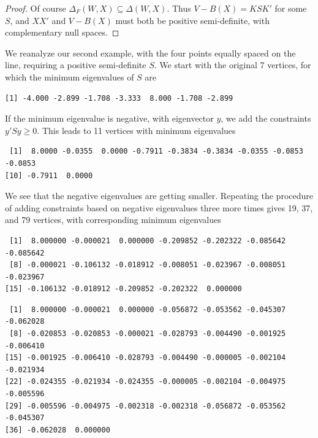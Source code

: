 \documentclass[
  12pt,
  letterpaper,
  DIV=11,
  numbers=noendperiod]{scrreprt}
\theoremstyle{remark}
\begin{document}
\begin{proof}
Of course \(\Delta_F(W,X)\subseteq\Delta(W,X)\). Thus \(V-B(X)=KSK'\)
for some \(S\), and \(XX'\) and \(V-B(X)\) must both be positive
semi-definite, with complementary null spaces.
\end{proof}

We reanalyze our second example, with the four points equally spaced on
the line, requiring a positive semi-definite \(S\). We start with the
original 7 vertices, for which the minimum eigenvalues of \(S\) are

\begin{verbatim}
[1] -4.000 -2.899 -1.708 -3.333  8.000 -1.708 -2.899
\end{verbatim}

If the minimum eigenvalue is negative, with eigenvector \(y\), we add
the constraints \(y'Sy\geq 0\). This leads to 11 vertices with minimum
eigenvalues

\begin{verbatim}
 [1]  8.0000 -0.0355  0.0000 -0.7911 -0.3834 -0.3834 -0.0355 -0.0853 -0.0853
[10] -0.7911  0.0000
\end{verbatim}

We see that the negative eigenvalues are getting smaller. Repeating the
procedure of adding constraints based on negative eigenvalues three more
times gives 19, 37, and 79 vertices, with corresponding minimum
eigenvalues

\begin{verbatim}
 [1]  8.000000 -0.000021  0.000000 -0.209852 -0.202322 -0.085642 -0.085642
 [8] -0.000021 -0.106132 -0.018912 -0.008051 -0.023967 -0.008051 -0.023967
[15] -0.106132 -0.018912 -0.209852 -0.202322  0.000000
\end{verbatim}

\begin{verbatim}
 [1]  8.000000 -0.000021  0.000000 -0.056872 -0.053562 -0.045307 -0.062028
 [8] -0.020853 -0.020853 -0.000021 -0.028793 -0.004490 -0.001925 -0.006410
[15] -0.001925 -0.006410 -0.028793 -0.004490 -0.000005 -0.002104 -0.021934
[22] -0.024355 -0.021934 -0.024355 -0.000005 -0.002104 -0.004975 -0.005596
[29] -0.005596 -0.004975 -0.002318 -0.002318 -0.056872 -0.053562 -0.045307
[36] -0.062028  0.000000
\end{verbatim}
\end{document}
